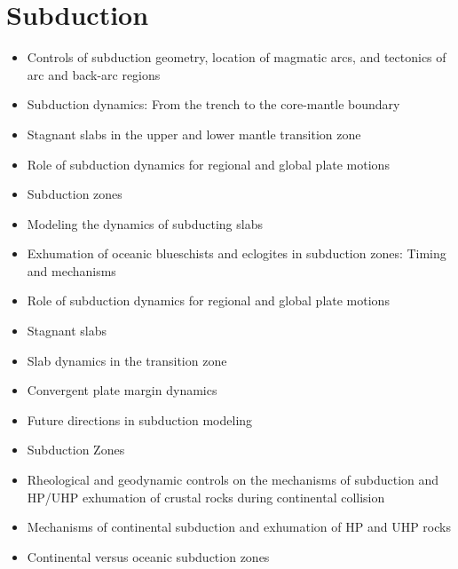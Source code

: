 

\section{Subduction}

   \begin{itemize}
   \item [\nineteeneightytwo] Controls of subduction geometry, location of magmatic arcs,
                              and tectonics of arc and back-arc regions \cite{crpi82}
   \item [\nineteenninetyfive] Subduction dynamics: From the trench
                               to the core-mantle boundary \cite{kinc95}
   \item [\twothousandone] Stagnant slabs in the upper and lower mantle transition zone \cite{fuwo01}
   \item [\twothousandone] Role of subduction dynamics for regional and global plate motions \cite{befa09}
   \item [\twothousandtwo] Subduction zones \cite{ster02}
   \item [\twothousandeight]Modeling the dynamics of subducting slabs \cite{bill08}
   \item [\twothousandnine] Exhumation of oceanic blueschists and eclogites in subduction zones: Timing and mechanisms \cite{agyj09}
   \item [\twothousandnine] Role of subduction dynamics for regional and global plate motions \cite{befa09}
   \item [\twothousandnine] Stagnant slabs \cite{fuon09}
   \item [\twothousandten]  Slab dynamics in the transition zone \cite{bill10}
   \item [\twothousandten]  Convergent plate margin dynamics \cite{scra10} 
   \item [\twothousandeleven] Future directions in subduction modeling \cite{gery11}
   \item [\twothousandthirteen] Subduction Zones \cite{bufv13}
   \item [\twothousandfourteen] Rheological and geodynamic controls on the mechanisms of subduction
and HP/UHP exhumation of crustal rocks during continental collision \cite{bufa14}
   \item [\twothousandfourteen] Mechanisms of continental subduction and exhumation of HP and UHP rocks \cite{bufy14b}
   \item [\twothousandsixteen]  Continental versus oceanic subduction zones \cite{zhch16}

\end{itemize}
